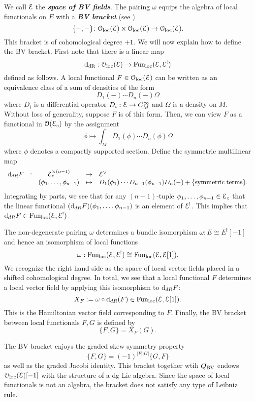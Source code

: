 \documentclass[10pt, oneside]{article}
\newcommand{\defterm}[1]{\textbf{\emph{#1}}}
\begin{document}
We call $\mathcal E$ the \defterm{space of BV fields}. The pairing $\omega$ equips the algebra of local functionals on $E$ with a \defterm{BV bracket} (see \cite[Chapter 5.3]{CostelloBook}) 
\[
\{-,-\}\colon \mathcal{O}_{\rm loc}(\mathcal E) \times \mathcal{O}_{\rm loc}(\mathcal E) \to \mathcal{O}_{\rm loc}(\mathcal E) .
\]
This bracket is of cohomological degree $+1$. 
We will now explain how to define the BV bracket.  First note that there is a linear map
\[
{\rm d}_{\mathrm{dR}} : \mathcal{O}_{\rm loc}(\mathcal E) \to {\rm Fun}_{\rm loc}(\mathcal E, \mathcal E^!) 
\]
defined as follows. 
A local functional $F \in  \mathcal{O}_{\rm loc}(\mathcal E)$ can be written as an equivalence class of a sum of densities of the form
\[
D_1(-) \cdots D_n(-) \Omega
\]
where $D_i$ is a differential operator $D_i : \mathcal E \to C^\infty_M$ and $\Omega$ is a density on $M$. 
Without loss of generality, suppose $F$ is of this form. 
Then, we can view $F$ as a functional in $\mathcal O(\mathcal E_c)$ by the assignment
\[
\phi \mapsto \int_M D_1(\phi) \cdots D_n(\phi) \Omega
\]
where $\phi$ denotes a compactly supported section. 
Define the symmetric multilinear map
\[
\begin{array}{ccccl}
{\rm d}_{dR} F & : & \mathcal E_c^{\times (n-1)} & \to & \mathcal E^\vee \\
& & (\phi_1, \ldots, \phi_{n-1}) & \mapsto & D_1(\phi_1) \cdots D_{n-1}(\phi_{n-1}) D_{n} (-) + \{{\rm symmetric\;terms}\} .
\end{array}
\]
Integrating by parts, we see that for any $(n-1)$-tuple $\phi_1, \ldots, \phi_{n-1} \in \mathcal E_c$ that the linear functional $({\rm d}_{dR} F) (\phi_1,\ldots, \phi_{n-1})$ is an element of $\mathcal E^!$. 
This implies that ${\rm d}_{dR} F \in {\rm Fun}_{\rm loc}(\mathcal E, \mathcal E^!)$.

The non-degenerate pairing $\omega$ determines a bundle isomorphism $\omega \colon E \cong E^! [-1]$ and hence an isomorphism of local functions
\[
\omega : {\rm Fun}_{\rm loc}(\mathcal E, \mathcal E^!) \cong {\rm Fun}_{\rm loc}(\mathcal E, \mathcal E[1]) .
\]
We recognize the right hand side as the space of local vector fields placed in a shifted cohomological degree.
In total, we see that a local functional $F$ determines a local vector field by applying this isomorphism to ${\rm d}_{dR}F$:
\[
X_F := \omega \circ {\rm d}_{dR} (F) \in  {\rm Fun}_{\rm loc}(\mathcal E, \mathcal E[1])  .
\]
This is the Hamiltonian vector field corresponding to $F$. 
Finally, the BV bracket between local functionals $F, G$ is defined by
\[
\{F, G\} = X_F (G) .
\]

The BV bracket enjoys the graded skew symmetry property
\[
\{F, G\} = (-1)^{|F| |G|} \{G, F\}
\]
as well as the graded Jacobi identity.
This bracket together wtih $Q_{\mathrm{BV}}$ endows $\mathcal{O}_{\rm loc}(\mathcal E)[-1]$ with the structure of a dg Lie algebra. 
Since the space of local functionals is not an algebra, the bracket does not satisfy any type of Leibniz rule. 
\end{document}
